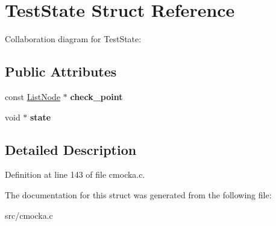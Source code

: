 \hypertarget{structTestState}{}\section{Test\+State Struct Reference}
\label{structTestState}


Collaboration diagram for Test\+State\+:
\subsection*{Public Attributes}
\begin{DoxyCompactItemize}
\item 
\mbox{\label{structTestState_a2c788f0404f8d97501b5cad7af459b5f}} 
const \hyperlink{structListNode}{List\+Node} $\ast$ {\bfseries check\+\_\+point}
\item 
\mbox{\label{structTestState_a7a40669131980ba9c632c6f9fa98f6a9}} 
void $\ast$ {\bfseries state}
\end{DoxyCompactItemize}


\subsection{Detailed Description}


Definition at line 143 of file cmocka.\+c.



The documentation for this struct was generated from the following file\+:\begin{DoxyCompactItemize}
\item 
src/cmocka.\+c\end{DoxyCompactItemize}
